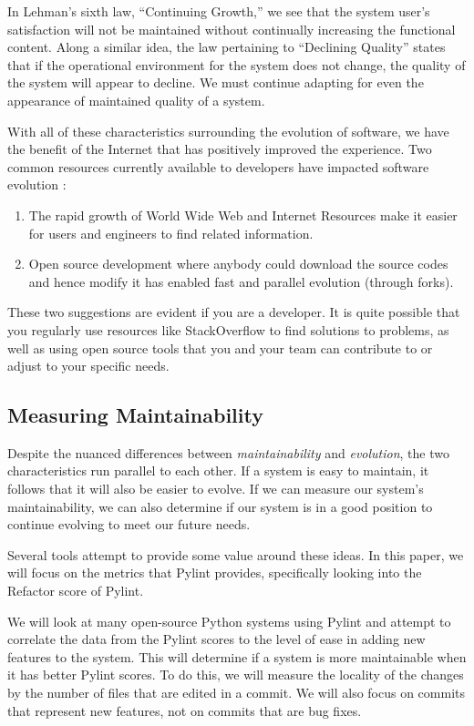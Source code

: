 \documentclass[12pt,conference]{IEEEtran}
\begin{document}
In Lehman's sixth law, ``Continuing Growth,'' we see that the system user's satisfaction will not be maintained without continually increasing the functional content. Along a similar idea, the law pertaining to ``Declining Quality'' states that if the operational environment for the system does not change, the quality of the system will appear to decline. We must continue adapting for even the appearance of maintained quality of a system.

With all of these characteristics surrounding the evolution of software, we have the benefit of the Internet that has positively improved the experience. Two common resources currently available to developers have impacted software evolution \cite{wiki:software-evolution}:

\begin{enumerate}
    \item The rapid growth of World Wide Web and Internet Resources make it easier for users and engineers to find related information.
    \item Open source development where anybody could download the source codes and hence modify it has enabled fast and parallel evolution (through forks).
\end{enumerate}

These two suggestions are evident if you are a developer. It is quite possible that you regularly use resources like StackOverflow to find solutions to problems, as well as using open source tools that you and your team can contribute to or adjust to your specific needs.

\subsection{Measuring Maintainability}

Despite the nuanced differences between \textit{maintainability} and \textit{evolution}, the two characteristics run parallel to each other. If a system is easy to maintain, it follows that it will also be easier to evolve. If we can measure our system's maintainability, we can also determine if our system is in a good position to continue evolving to meet our future needs.

Several tools attempt to provide some value around these ideas. In this paper, we will focus on the metrics that Pylint provides, specifically looking into the Refactor score of Pylint.

We will look at many open-source Python systems using Pylint and attempt to correlate the data from the Pylint scores to the level of ease in adding new features to the system. This will determine if a system is more maintainable when it has better Pylint scores. To do this, we will measure the locality of the changes by the number of files that are edited in a commit. We will also focus on commits that represent new features, not on commits that are bug fixes.
\end{document}
